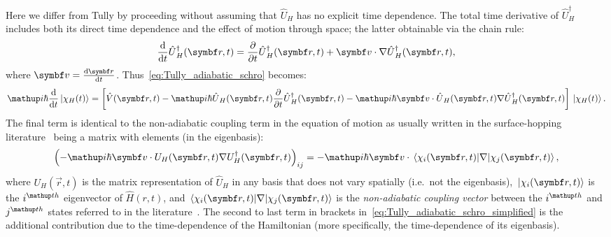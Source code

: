 Here we differ from Tully by proceeding without assuming that $\hat U_H$ has no explicit time dependence. The total time derivative of $\hat U_H^\dagger$ includes both its direct time dependence and the effect of motion through space; the latter obtainable via the chain rule:
\begin{align}
\dv{t}\hat U^\dagger_H(\vec r, t)
 = \pdv{t} \hat U^\dagger_H(\vec r, t) + \vec v\cdot \nabla \hat U^\dagger_H(\vec r, t),
\end{align}
where $\vec v = \dv{\vec r}{t}$. Thus~\eqref{eq:Tully_adiabatic_schro} becomes:
\begin{align}\label{eq:Tully_adiabatic_schro_simplified}
\ii\hbar\dv{t}\ket{\chi_H(t)} = \left[
  \hat V(\vec r, t)
  - \ii\hbar\hat U_H(\vec r, t)\pdv{t} \hat U^\dagger_H(\vec r, t)
   - \ii\hbar\vec v\cdot \hat U_H(\vec r, t)\nabla \hat U^\dagger_H(\vec r, t)
 \right]\ket{\chi_H(t)}.
\end{align}
The final term is identical to the non-adiabatic coupling term in the equation of motion as usually written in the surface-hopping literature~\cite{doi:10.1146/annurev-physchem-040215-112245} being a matrix with elements (in the eigenbasis):
\begin{align}
\left(- \ii\hbar\vec v\cdot U_H(\vec r, t)\nabla U^\dagger_H(\vec r, t)\right)_{ij}
= - \ii\hbar\vec v\cdot\matrixel{\chi_i(\vec r, t)}{\nabla}{\chi_j (\vec r, t)},
\end{align}
where $U_H(\vec r, t)$ is the matrix representation of $\hat U_H$ in any basis that does not vary spatially (i.e.~not the eigenbasis), $\ket{\chi_i(\vec r, t)}$ is the $i^\up{th}$ eigenvector of $\hat H(r, t)$, and $\matrixel{\chi_i(\vec r, t)}{\nabla}{\chi_j (\vec r, t)}$ is the \emph{non-adiabatic coupling vector} between the $i^\up{th}$ and $j^\up{th}$ states referred to in the literature~\cite{doi:10.1146/annurev-physchem-040215-112245}. The second to last term in brackets in~\eqref{eq:Tully_adiabatic_schro_simplified}
is the additional contribution due to the time-dependence of the Hamiltonian (more specifically, the time-dependence of its eigenbasis).

